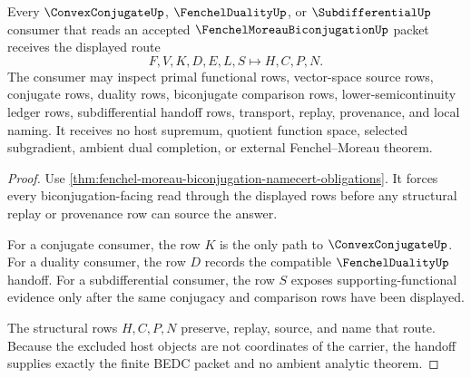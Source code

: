 \begin{theorem}
\label{thm:fenchel-moreau-biconjugation-conjugate-handoff}
Every $\ConvexConjugateUp$, $\FenchelDualityUp$, or $\SubdifferentialUp$ consumer that reads an accepted $\FenchelMoreauBiconjugationUp$ packet receives the displayed route
$$
F,V,K,D,E,L,S\longmapsto H,C,P,N.
$$
The consumer may inspect primal functional rows, vector-space source rows, conjugate rows, duality rows, biconjugate comparison rows, lower-semicontinuity ledger rows, subdifferential handoff rows, transport, replay, provenance, and local naming. It receives no host supremum, quotient function space, selected subgradient, ambient dual completion, or external Fenchel--Moreau theorem.
\end{theorem}
\begin{proof}
Use \autoref{thm:fenchel-moreau-biconjugation-namecert-obligations}. It forces every biconjugation-facing read through the displayed rows before any structural replay or provenance row can source the answer.

For a conjugate consumer, the row $K$ is the only path to $\ConvexConjugateUp$. For a duality consumer, the row $D$ records the compatible $\FenchelDualityUp$ handoff. For a subdifferential consumer, the row $S$ exposes supporting-functional evidence only after the same conjugacy and comparison rows have been displayed.

The structural rows $H,C,P,N$ preserve, replay, source, and name that route. Because the excluded host objects are not coordinates of the carrier, the handoff supplies exactly the finite BEDC packet and no ambient analytic theorem.
\end{proof}


\begin{closurestatus}{\FenchelMoreauBiconjugationUp}
  \theoryclosure{\seedClosure}
  \formalstatus{\unformalizedV}
\end{closurestatus}

